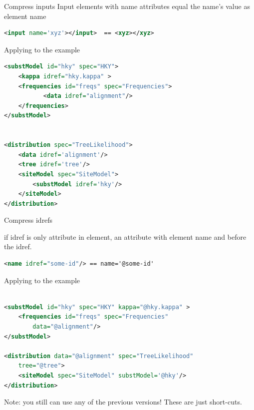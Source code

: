\documentclass{beamer}
\theoremstyle{definition}
\begin{document}
\begin{frame}[containsverbatim]{Compress inputs}
Input elements with name attributes equal the name's value as element name

\begin{lstlisting}[language=XML]
<input name='xyz'></input>  == <xyz></xyz>
\end{lstlisting}

Applying to the example


{\small
\begin{lstlisting}[language=XML]
<substModel id="hky" spec="HKY">
    <kappa idref="hky.kappa" >
    <frequencies id="freqs" spec="Frequencies">
           <data idref="alignment"/>
    </frequencies>
</substModel>


<distribution spec="TreeLikelihood">
    <data idref='alignment'/>
    <tree idref='tree'/>
    <siteModel spec="SiteModel">
        <substModel idref='hky'/>
    </siteModel>
</distribution>
\end{lstlisting}
}
\end{frame}

\begin{frame}[containsverbatim]{Compress idrefs}

if idref is only attribute in element, an attribute with element
name and \@ before the idref.

\begin{lstlisting}[language=XML]
<name idref="some-id"/> == name='@some-id'
\end{lstlisting}

Applying to the example

{\small
\begin{lstlisting}[language=XML]

<substModel id="hky" spec="HKY" kappa="@hky.kappa" >
    <frequencies id="freqs" spec="Frequencies" 
        data="@alignment"/>
</substModel>

<distribution data="@alignment" spec="TreeLikelihood" 
    tree="@tree">
    <siteModel spec="SiteModel" substModel='@hky'/>
</distribution>
\end{lstlisting}
}
Note: you still can use any of the previous versions! These are just short-cuts.
\end{frame}
\end{document}
